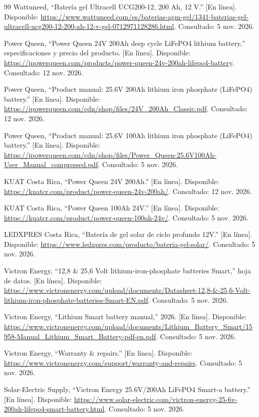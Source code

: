 \documentclass[conference]{IEEEtran}
\begin{document}
\begin{thebibliography}{99}
 Wattuneed, ``Batería gel Ultracell UCG200-12, 200 Ah, 12 V.'' [En línea]. Disponible: \url{https://www.wattuneed.com/es/baterias-agm-gel/1341-baterias-gel-ultracell-ucg200-12-200-ah-12-v-gel-0712971128286.html}. Consultado: 5 nov. 2026.

 Power Queen, ``Power Queen 24V 200Ah deep cycle LiFePO4 lithium battery,'' especificaciones y precio del producto. [En línea]. Disponible: \url{https://ipowerqueen.com/products/power-queen-24v-200ah-lifepo4-battery}. Consultado: 12 nov. 2026.

 Power Queen, ``Product manual: 25.6V 200Ah lithium iron phosphate (LiFePO4) battery.'' [En línea]. Disponible: \url{https://ipowerqueen.com/cdn/shop/files/24V_200Ah_Classic.pdf}. Consultado: 12 nov. 2026.

 Power Queen, ``Product manual: 25.6V 100Ah lithium iron phosphate (LiFePO4) battery.'' [En línea]. Disponible: \url{https://ipowerqueen.com/cdn/shop/files/Power_Queen-25.6V100Ah-User_Manual_compressed.pdf}. Consultado: 5 nov. 2026.

 KUAT Costa Rica, ``Power Queen 24V 200Ah.'' [En línea]. Disponible: \url{https://kuatcr.com/product/power-queen-24v-200ah/}. Consultado: 12 nov. 2026.

 KUAT Costa Rica, ``Power Queen 100Ah 24V.'' [En línea]. Disponible: \url{https://kuatcr.com/product/power-queen-100ah-24v/}. Consultado: 5 nov. 2026.

 LEDXPRES Costa Rica, ``Batería de gel solar de ciclo profundo 12V.'' [En línea]. Disponible: \url{https://www.ledxpres.com/producto/bateria-gel-solar/}. Consultado: 5 nov. 2026.

 Victron Energy, ``12,8 \& 25,6 Volt lithium-iron-phosphate batteries Smart,'' hoja de datos. [En línea]. Disponible: \url{https://www.victronenergy.com/upload/documents/Datasheet-12,8-&-25,6-Volt-lithium-iron-phosphate-batteries-Smart-EN.pdf}. Consultado: 5 nov. 2026.

 Victron Energy, ``Lithium Smart battery manual,'' 2026. [En línea]. Disponible: \url{https://www.victronenergy.com/upload/documents/Lithium_Battery_Smart/15958-Manual_Lithium_Smart_Battery-pdf-en.pdf}. Consultado: 5 nov. 2026.

 Victron Energy, ``Warranty \& repairs.'' [En línea]. Disponible: \url{https://www.victronenergy.com/support/warranty-and-repairs}. Consultado: 5 nov. 2026.

 Solar-Electric Supply, ``Victron Energy 25.6V/200Ah LiFePO4 Smart-a battery.'' [En línea]. Disponible: \url{https://www.solar-electric.com/victron-energy-25-6v-200ah-lifepo4-smart-battery.html}. Consultado: 5 nov. 2026.

\end{thebibliography}
\end{document}
